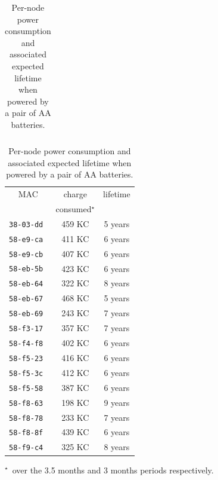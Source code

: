 \documentclass{elsarticle}
\newcommand{\building}            {Smart Building\xspace}
\newcommand{\agri}                {Smart Agriculture\xspace}
\begin{document}
\begin{table}
\begin{subtable}{.5\textwidth}
\begin{tabular}{|c|c|r|}
        \bottomrule
    \end{tabular}
    \caption{\agri}
\end{subtable}\hfill
\begin{subtable}{.43\textwidth}
    \begin{tabular}{|c|c|c|}
        \toprule
        MAC           &  charge  & lifetime \\
                      & consumed$^\star$ &          \\
        \midrule
        \tt{38-03-dd} &          459 KC &  5 years \\
        \tt{58-e9-ca} &          411 KC &  6 years \\
        \tt{58-e9-cb} &          407 KC &  6 years \\
        \tt{58-eb-5b} &          423 KC &  6 years \\
        \tt{58-eb-64} &          322 KC &  8 years \\
        \tt{58-eb-67} &          468 KC &  5 years \\
        \tt{58-eb-69} &          243 KC &  7 years \\
        \tt{58-f3-17} &          357 KC &  7 years \\
        \tt{58-f4-f8} &          402 KC &  6 years \\
        \tt{58-f5-23} &          416 KC &  6 years \\
        \tt{58-f5-3c} &          412 KC &  6 years \\
        \tt{58-f5-58} &          387 KC &  6 years \\
        \tt{58-f8-63} &          198 KC &  9 years \\
        \tt{58-f8-78} &          233 KC &  7 years \\
        \tt{58-f8-8f} &          439 KC &  6 years \\
        \tt{58-f9-c4} &          325 KC &  8 years \\
        \bottomrule
    \end{tabular}
    \caption{\building}
\end{subtable}\hfill
\vspace{2mm}
$^\star$~over the 3.5 months and 3 months periods respectively.
\caption{Per-node power consumption and associated expected lifetime when powered by a pair of AA batteries.}
\label{tab:stats_charge}
\end{table}

\end{document}

